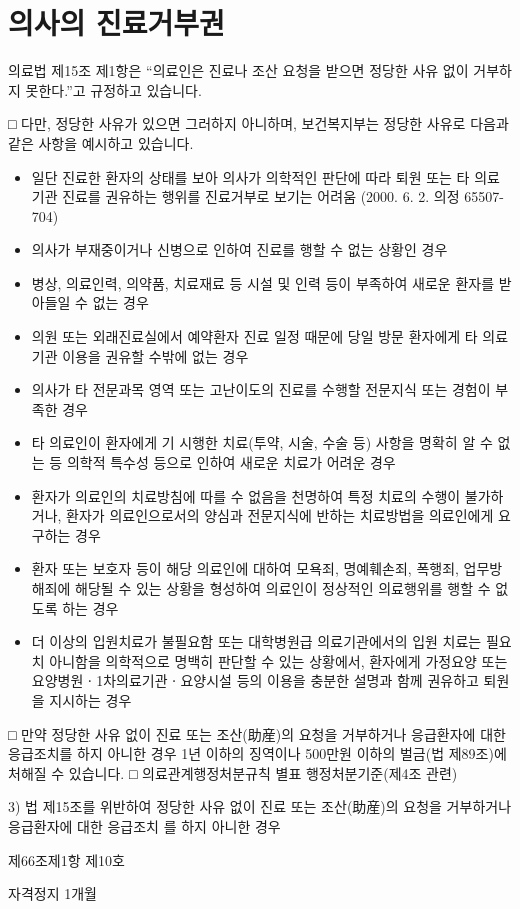 \section{의사의 진료거부권}
의료법 제15조 제1항은 “의료인은 진료나 조산 요청을 받으면 정당한 사유 없이 거부하지 못한다.”고 규정하고 있습니다.\par
□ 다만, 정당한 사유가 있으면 그러하지 아니하며, 보건복지부는 정당한 사유로 다음과 같은 사항을 예시하고 있습니다.

\begin{itemize}\tightlist
\item 일단 진료한 환자의 상태를 보아 의사가 의학적인 판단에 따라 퇴원 또는 타 의료기관 진료를 권유하는 행위를 진료거부로 보기는 어려움 (2000. 6. 2. 의정 65507-704)
\item 의사가 부재중이거나 신병으로 인하여 진료를 행할 수 없는 상황인 경우
\item 병상, 의료인력, 의약품, 치료재료 등 시설 및 인력 등이 부족하여 새로운 환자를 받아들일 수 없는 경우
\item 의원 또는 외래진료실에서 예약환자 진료 일정 때문에 당일 방문 환자에게 타 의료기관 이용을 권유할 수밖에 없는 경우
\item 의사가 타 전문과목 영역 또는 고난이도의 진료를 수행할 전문지식 또는 경험이 부족한 경우
\item 타 의료인이 환자에게 기 시행한 치료(투약, 시술, 수술 등) 사항을 명확히 알 수 없는 등 의학적 특수성 등으로 인하여 새로운 치료가 어려운 경우
\item 환자가 의료인의 치료방침에 따를 수 없음을 천명하여 특정 치료의 수행이 불가하거나, 환자가 의료인으로서의 양심과 전문지식에 반하는 치료방법을 의료인에게 요구하는 경우
\item 환자 또는 보호자 등이 해당 의료인에 대하여 모욕죄, 명예훼손죄, 폭행죄, 업무방해죄에 해당될 수 있는 상황을 형성하여 의료인이 정상적인 의료행위를 행할 수 없도록 하는 경우
\item 더 이상의 입원치료가 불필요함 또는 대학병원급 의료기관에서의 입원 치료는 필요치 아니함을 의학적으로 명백히 판단할 수 있는 상황에서, 환자에게 가정요양 또는 요양병원ㆍ1차의료기관ㆍ요양시설 등의 이용을 충분한 설명과 함께 권유하고 퇴원을 지시하는 경우
\end{itemize}
□ 만약 정당한 사유 없이 진료 또는 조산(助産)의 요청을 거부하거나 응급환자에 대한 응급조치를 하지 아니한 경우 1년 이하의 징역이나 500만원 이하의 벌금(법 제89조)에 처해질 수 있습니다.
□ 의료관계행정처분규칙 별표 행정처분기준(제4조 관련)
\begin{description}\tightlist
\item[위반사항] 3) 법 제15조를 위반하여 정당한 사유 없이 진료 또는 조산(助産)의 요청을 거부하거나 응급환자에 대한 응급조치
를 하지 아니한 경우
\item[근거법령] 제66조제1항 제10호
\item[행정처분기준] 자격정지 1개월
\end{description}


